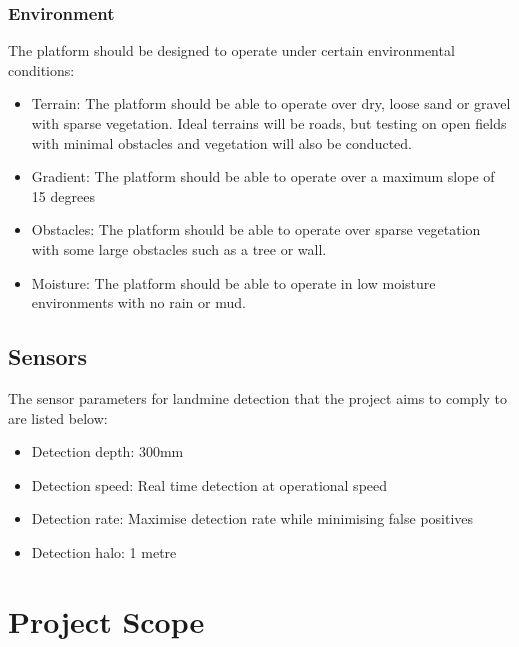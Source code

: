 \documentclass[main.tex]{subfiles}
\begin{document}
\subsubsection{Environment}

The platform should be designed to operate under certain environmental conditions:
\begin{itemize}
\item Terrain: The platform should be able to operate over dry, loose sand or gravel with sparse vegetation. Ideal terrains will be roads, but testing on open fields with minimal obstacles and vegetation will also be conducted.
\item Gradient: The platform should be able to operate over a maximum slope of 15 degrees
\item Obstacles: The platform should be able to operate over sparse vegetation with some large obstacles such as a tree or wall.
\item Moisture: The platform should be able to operate in low moisture environments with no rain or mud.
\end{itemize}
\subsection{Sensors}
The sensor parameters for landmine detection that the project aims to comply to are listed below:
\begin{itemize}
\item Detection depth: 300mm 
\item Detection speed: Real time detection at operational speed
\item Detection rate: Maximise detection rate while minimising false positives
\item Detection halo: 1 metre
\end{itemize}

\section{Project Scope}
\end{document}
